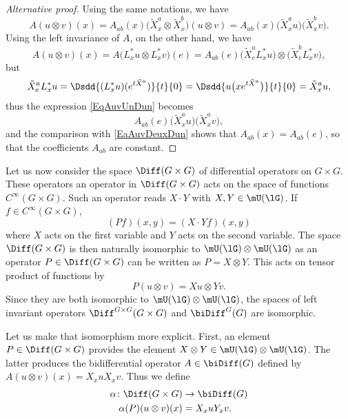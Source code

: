 \begin{proof}[Alternative proof]
	Using the same notations, we have
	\begin{equation}		\label{EaAuvDeuxDun}
		A(u\otimes v)(x)=A_{ab}(x)\big( \tilde X^a_x\otimes\tilde X^b_x \big)(u\otimes v)=A_{ab}(x)\big( \tilde X^a_xu \big)\big( \tilde X^b_xv \big).
	\end{equation}
	Using the left invariance of $A$, on the other hand, we have
	\begin{equation}		\label{EqAuvUnDun}
		A(u\otimes v)(x)=A\big( L^*_xu\otimes L^*_xv \big)(e)=A_{ab}(e)\big( \tilde X^a_eL^*_xu \big)\otimes\big( \tilde X^b_eL^*_xv \big),
	\end{equation}
	but
	\begin{equation}
		\tilde X^a_eL^*_xu=\Dsdd{ (L^*_xu)( e^{t\tilde X^a}) }{t}{0}=\Dsdd{ u\big( x e^{t\tilde X^a} \big) }{t}{0}=\tilde X^a_xu,
	\end{equation}
	thus the expression \eqref{EqAuvUnDun} becomes
	\begin{equation}
		A_{ab}(e)\big( \tilde X^a_xu \big)\big( \tilde X^a_xv \big),
	\end{equation}
	and the comparison with \eqref{EaAuvDeuxDun} shows that $A_{ab}(x)=A_{ab}(e)$, so that the coefficients $A_{ab}$ are constant.
\end{proof}

Let us now consider the space $\Diff(G\times G)$ of differential operators on $G\times G$. These operators an operator in $\Diff(G\times G)$ acts on the space of functions $ C^{\infty}(G\times G)$. Such an operator reads $X\cdot Y$ with $X,Y\in\mU(\lG)$. If $f\in C^{\infty}(G\times G)$,
\begin{equation}
	(Pf)(x,y)=(X\cdot Y f)(x,y)
\end{equation}
where $X$ acts on the first variable and $Y$ acts on the second variable. The space $\Diff(G\times G)$ is then naturally isomorphic to $\mU(\lG)\otimes \mU(\lG)$ as an operator $P\in\Diff(G\times G)$ can be written as $P=X\otimes Y$. This acts on tensor product of functions by
\begin{equation}
	P(u\otimes v)=Xu\otimes Yv.
\end{equation}
Since they are both isomorphic to $\mU(\lG)\otimes\mU(\lG)$, the spaces of left invariant operators $\Diff^{G\times G}(G\times G)$ and $\biDiff^G(G)$ are isomorphic.

Let us make that isomorphism more explicit. First, an element $P\in\Diff(G\times G)$ provides the element $X\otimes Y\in\mU(\lG)\otimes\mU(\lG)$. The latter produces the bidifferential operator $A\in\biDiff(G)$ defined by $A(u\otimes v)(x)=X_xuX_xv$. Thus we define
\begin{equation}		\label{EqDefAlphaDiffbiDiff}
	\begin{aligned}
		\alpha\colon \Diff(G\times G)&\to \biDiff(G) \\
		\alpha(P)(u\otimes v)(x)&=X_xuY_xv.
	\end{aligned}
\end{equation}

